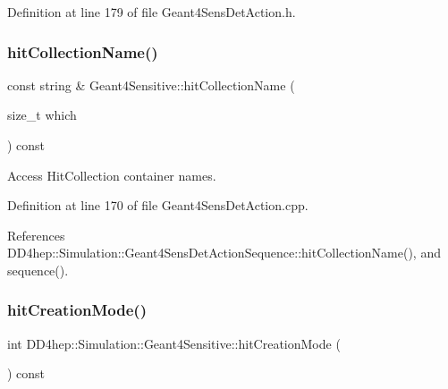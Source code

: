 Definition at line 179 of file Geant4\+Sens\+Det\+Action.\+h.

\hypertarget{class_d_d4hep_1_1_simulation_1_1_geant4_sensitive_aafc865d1ca6e2120609997e96eb68440}{}\label{class_d_d4hep_1_1_simulation_1_1_geant4_sensitive_aafc865d1ca6e2120609997e96eb68440} 
\subsubsection{\texorpdfstring{hit\+Collection\+Name()}{hitCollectionName()}}
{\footnotesize\ttfamily const string \& Geant4\+Sensitive\+::hit\+Collection\+Name (\begin{DoxyParamCaption}\item[{size\+\_\+t}]{which }\end{DoxyParamCaption}) const}



Access Hit\+Collection container names. 



Definition at line 170 of file Geant4\+Sens\+Det\+Action.\+cpp.



References D\+D4hep\+::\+Simulation\+::\+Geant4\+Sens\+Det\+Action\+Sequence\+::hit\+Collection\+Name(), and sequence().

\hypertarget{class_d_d4hep_1_1_simulation_1_1_geant4_sensitive_a31dfbd49f28fadb58f4ede4a916dd1b4}{}\label{class_d_d4hep_1_1_simulation_1_1_geant4_sensitive_a31dfbd49f28fadb58f4ede4a916dd1b4} 
\subsubsection{\texorpdfstring{hit\+Creation\+Mode()}{hitCreationMode()}}
{\footnotesize\ttfamily int D\+D4hep\+::\+Simulation\+::\+Geant4\+Sensitive\+::hit\+Creation\+Mode (\begin{DoxyParamCaption}{ }\end{DoxyParamCaption}) const\hspace{0.3cm}{\ttfamily [inline]}}



